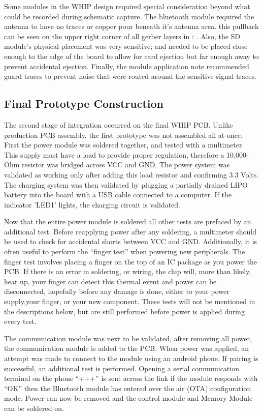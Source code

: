 Some modules in the WHIP design required special consideration beyond what could be recorded during schematic capture. The bluetooth module required the antenna to have no traces or copper pour beneath it's antenna area. this pullback can be seen on the upper right corner of all gerber layers in  : . Also, the SD module's physical placement was very sensitive; and needed to be placed close enough to the edge of the board to allow for card ejection but far enough away to prevent accidental ejection. Finally, the  module application note recommended guard traces to prevent noise that were routed around the sensitive signal traces. 


\subsection {Final Prototype Construction}
The second stage of integration occurred on the final WHIP PCB. Unlike production PCB assembly, the first prototype was not assembled all at once. First the power module was soldered together, and tested with a multimeter. This supply must have a load to provide proper regulation, therefore a 10,000-Ohm resistor was bridged across VCC and GND. The power system was validated as working only after adding this load resistor and confirming 3.3 Volts. The charging system was then validated by plugging a partially drained LIPO battery into the board with a USB cable connected to a computer. If the indicator 'LED1' lights, the charging circuit is validated. 

Now that the entire power module is soldered all other tests are prefaced by an additional test. Before reapplying power after any soldering, a multimeter should be used to check for accidental shorts between VCC and GND. Additionally, it is often useful to perform the ``finger test'' when powering new peripherals. The finger test involves placing a finger on the top of an IC package as you power the PCB. If there is an error in soldering, or wiring, the chip will, more than likely, heat up, your finger can detect this thermal event and power can be disconnected, hopefully before any damage is done, either to your power supply,your finger, or your new component. These tests will not be mentioned in the descriptions below, but are still performed before power is applied during every test.

The communication module was next to be validated, after removing all power, the communication module is added to the PCB. When power was applied, an attempt was made to connect to the module using an android phone. If pairing is successful, an additional test is performed. Opening a serial communication terminal on the phone ``+++'' is sent across the link if the module responds with ``OK'' then the Bluetooth module has entered over the air (OTA) configuration mode. Power can now be removed and the control module and Memory Module can be soldered on. 


